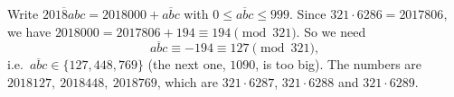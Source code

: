 Write $\overline{2018abc}=2018000+\overline{abc}$ with $0\le\overline{abc}\le999$. Since $321\cdot6286=2017806$, we have $2018000=2017806+194\equiv194\pmod{321}$. So we need
\[
\overline{abc}\equiv-194\equiv127\pmod{321},
\]
i.e.\ $\overline{abc}\in\{127,448,769\}$ (the next one, $1090$, is too big). The numbers are $\boxed{2018127,\ 2018448,\ 2018769}$, which are $321\cdot6287$, $321\cdot6288$ and $321\cdot6289$.
